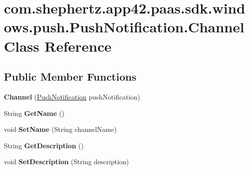 \hypertarget{classcom_1_1shephertz_1_1app42_1_1paas_1_1sdk_1_1windows_1_1push_1_1_push_notification_1_1_channel}{\section{com.\+shephertz.\+app42.\+paas.\+sdk.\+windows.\+push.\+Push\+Notification.\+Channel Class Reference}
\label{classcom_1_1shephertz_1_1app42_1_1paas_1_1sdk_1_1windows_1_1push_1_1_push_notification_1_1_channel}
}
\subsection*{Public Member Functions}
\begin{DoxyCompactItemize}
\item 
\hypertarget{classcom_1_1shephertz_1_1app42_1_1paas_1_1sdk_1_1windows_1_1push_1_1_push_notification_1_1_channel_a4d64c68c86bc67dbd48b6f07088d977f}{{\bfseries Channel} (\hyperlink{classcom_1_1shephertz_1_1app42_1_1paas_1_1sdk_1_1windows_1_1push_1_1_push_notification}{Push\+Notification} push\+Notification)}\label{classcom_1_1shephertz_1_1app42_1_1paas_1_1sdk_1_1windows_1_1push_1_1_push_notification_1_1_channel_a4d64c68c86bc67dbd48b6f07088d977f}

\item 
\hypertarget{classcom_1_1shephertz_1_1app42_1_1paas_1_1sdk_1_1windows_1_1push_1_1_push_notification_1_1_channel_a26afb0baf4780d09bc664746ba68cf5e}{String {\bfseries Get\+Name} ()}\label{classcom_1_1shephertz_1_1app42_1_1paas_1_1sdk_1_1windows_1_1push_1_1_push_notification_1_1_channel_a26afb0baf4780d09bc664746ba68cf5e}

\item 
\hypertarget{classcom_1_1shephertz_1_1app42_1_1paas_1_1sdk_1_1windows_1_1push_1_1_push_notification_1_1_channel_adf048c89ac12241d253e0d95702b7f9a}{void {\bfseries Set\+Name} (String channel\+Name)}\label{classcom_1_1shephertz_1_1app42_1_1paas_1_1sdk_1_1windows_1_1push_1_1_push_notification_1_1_channel_adf048c89ac12241d253e0d95702b7f9a}

\item 
\hypertarget{classcom_1_1shephertz_1_1app42_1_1paas_1_1sdk_1_1windows_1_1push_1_1_push_notification_1_1_channel_a350f3c26a37cd491b2f59630dbdac7c2}{String {\bfseries Get\+Description} ()}\label{classcom_1_1shephertz_1_1app42_1_1paas_1_1sdk_1_1windows_1_1push_1_1_push_notification_1_1_channel_a350f3c26a37cd491b2f59630dbdac7c2}

\item 
\hypertarget{classcom_1_1shephertz_1_1app42_1_1paas_1_1sdk_1_1windows_1_1push_1_1_push_notification_1_1_channel_a7d4fb96e39ace9db0145d257d67740c1}{void {\bfseries Set\+Description} (String description)}\label{classcom_1_1shephertz_1_1app42_1_1paas_1_1sdk_1_1windows_1_1push_1_1_push_notification_1_1_channel_a7d4fb96e39ace9db0145d257d67740c1}

\end{DoxyCompactItemize}
